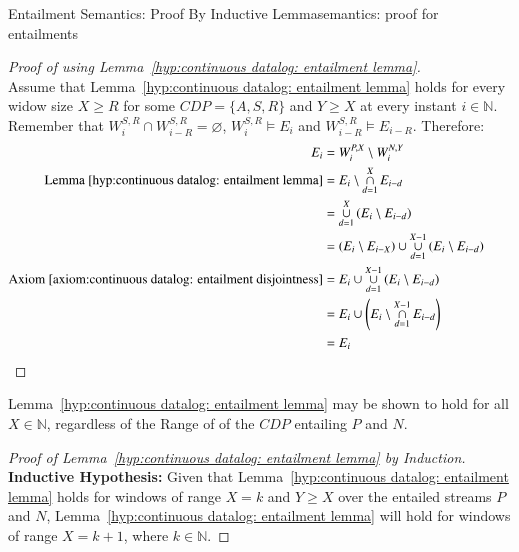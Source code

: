 \begin{nestedsection}{Entailment Semantics: Proof By Inductive Lemma}{semantics: proof for entailments}
	\begin{proof}[Proof of  using Lemma~\ref{hyp:continuous datalog: entailment lemma}]\hfill\\
		Assume that Lemma~\ref{hyp:continuous datalog: entailment lemma} holds for every widow size ${X \geq R}$ for some ${CDP = \{A,S,R\}}$ and ${Y \geq X}$ at every instant ${i \in \mathbb{N}}$.
		Remember that ${W^{S,R}_{i} \cap W^{S,R}_{i-R} = \varnothing}$, ${W^{S,R}_{i} \vDash E_{i}}$ and ${W^{S,R}_{i-R} \vDash E_{i-R}}$.
		Therefore:
		\begin{align*}
			E_{i} & = W^{P,X}_{i} \setminus W^{N,Y}_{i} \\
			\text{Lemma~\ref{hyp:continuous datalog: entailment lemma}} & = E_{i} \setminus \mathop{\cap}^{X}_{d=1} E_{i-d} \\
			& = \mathop{\cup}^{X}_{d=1} \left( E_{i} \setminus E_{i-d} \right) \\
			& = \left( E_{i} \setminus E_{i-X} \right) \cup \mathop{\cup}^{X-1}_{d=1} \left( E_{i} \setminus E_{i-d} \right) \\
			\text{Axiom~\ref{axiom:continuous datalog: entailment disjointness}} & = E_{i} \cup \mathop{\cup}^{X-1}_{d=1} \left( E_{i} \setminus E_{i-d} \right) \\
			& = E_{i} \cup \left( E_{i} \setminus \mathop{\cap}^{X-1}_{d=1} E_{i-d} \right) \\
			& = E_{i} && \qedhere
		\end{align*}
	\end{proof}

	Lemma~\ref{hyp:continuous datalog: entailment lemma} may be shown to hold for all ${X \in \mathbb{N}}$, regardless of the Range of of the ${CDP}$ entailing $P$ and $N$.

	\begin{proof}[Proof of Lemma~\ref{hyp:continuous datalog: entailment lemma} by Induction]
		\textbf{Inductive Hypothesis:} Given that Lemma~\ref{hyp:continuous datalog: entailment lemma} holds for windows of range ${X = k}$ and ${Y \geq X}$ over the entailed streams $P$ and $N$, Lemma~\ref{hyp:continuous datalog: entailment lemma} will hold for windows of range ${X = k + 1}$, where ${k \in \mathbb{N}}$.


\end{proof}
\end{nestedsection}
